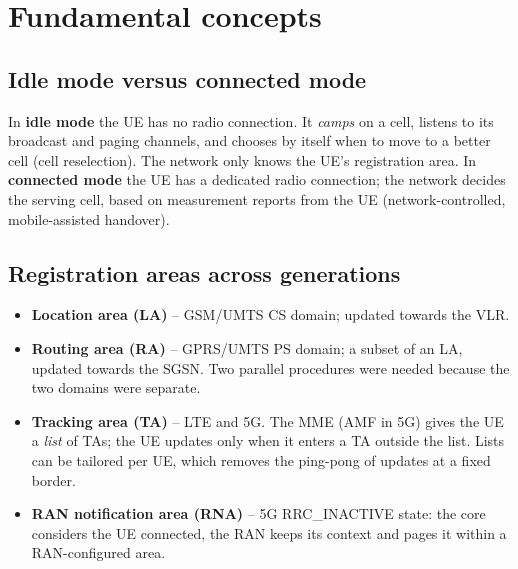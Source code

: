 \documentclass[11pt,a4paper]{article}
\begin{document}
\section{Fundamental concepts}

\subsection{Idle mode versus connected mode}
In \textbf{idle mode} the UE has no radio connection. It \emph{camps} on a cell, listens to its
broadcast and paging channels, and chooses by itself when to move to a better cell (cell
reselection). The network only knows the UE's registration area. In \textbf{connected mode}
the UE has a dedicated radio connection; the network decides the serving cell, based on
measurement reports from the UE (network-controlled, mobile-assisted handover).

\subsection{Registration areas across generations}
\begin{itemize}
  \item \textbf{Location area (LA)} -- GSM/UMTS CS domain; updated towards the VLR.
  \item \textbf{Routing area (RA)} -- GPRS/UMTS PS domain; a subset of an LA, updated towards
        the SGSN. Two parallel procedures were needed because the two domains were separate.
  \item \textbf{Tracking area (TA)} -- LTE and 5G. The MME (AMF in 5G) gives the UE a
        \emph{list} of TAs; the UE updates only when it enters a TA outside the list. Lists
        can be tailored per UE, which removes the ping-pong of updates at a fixed border.
  \item \textbf{RAN notification area (RNA)} -- 5G RRC\_INACTIVE state: the core considers the UE
        connected, the RAN keeps its context and pages it within a RAN-configured area.
\end{itemize}

\begin{acnfigure}
  \caption{Registration areas of successive generations.}
  \label{fig:areas}
\end{acnfigure}
\end{document}
